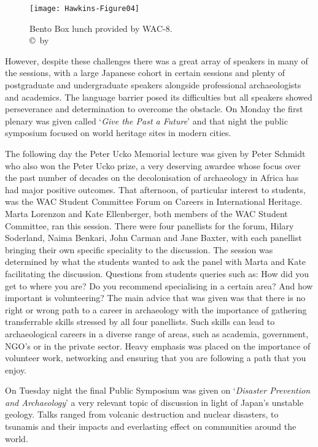 \begin{figure}[!htb] %
	\centering
	\texttt{[image: Hawkins-Figure04]}
	\caption{Bento Box lunch provided by WAC-8. 
		{\normalfont\scriptsize \\ \copyright\ by }}
	\label{fig:Hawkins-Figure04}
\end{figure}

However, despite these challenges there was a great array of speakers in many of the sessions, with a large Japanese cohort in certain sessions and plenty of postgraduate and undergraduate speakers alongside professional archaeologists and academics. The language barrier posed its difficulties but all speakers showed perseverance and determination to overcome the obstacle. On Monday the first plenary was given called ‘\textit{Give the Past a Future}’ and that night the public symposium focused on world heritage sites in modern cities. 

The following day the Peter Ucko Memorial lecture was given by Peter Schmidt who also won the Peter Ucko prize, a very deserving awardee whose focus over the past number of decades on the decolonisation of archaeology in Africa has had major positive outcomes. That afternoon, of particular interest to students, was the WAC Student Committee Forum on Careers in International Heritage. Marta Lorenzon and Kate Ellenberger, both members of the WAC Student Committee, ran this session. There were four panellists for the forum, Hilary Soderland, Naima Benkari, John Carman and Jane Baxter, with each panellist bringing their own specific speciality to the discussion. The session was determined by what the students wanted to ask the panel with Marta and Kate facilitating the discussion. Questions from students queries such as: How did you get to where you are? Do you recommend specialising in a certain area? And how important is volunteering? The main advice that was given was that there is no right or wrong path to a career in archaeology with the importance of gathering transferrable skills stressed by all four panellists. Such skills can lead to archaeological careers in a diverse range of areas, such as academia, government, NGO’s or in the private sector. Heavy emphasis was placed on the importance of volunteer work, networking and ensuring that you are following a path that you enjoy. 

On Tuesday night the final Public Symposium was given on ‘\textit{Disaster Prevention and Archaeology}’ a very relevant topic of discussion in light of Japan’s unstable geology. Talks ranged from volcanic destruction and nuclear disasters, to tsunamis and their impacts and everlasting effect on communities around the world.

